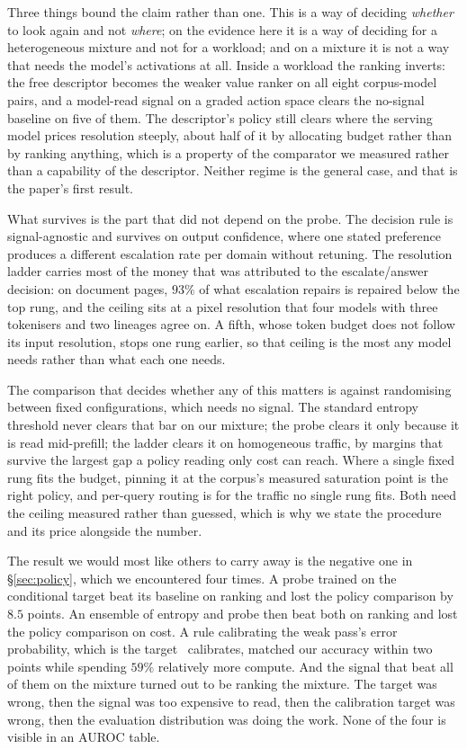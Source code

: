 \documentclass[10pt,twocolumn]{article}
\theoremstyle{plain}
\begin{document}
Three things bound the claim rather than one. This is a way of deciding
\emph{whether} to look again and not \emph{where}; on the evidence here it is a
way of deciding for a heterogeneous mixture and not for a workload; and on a
mixture it is not a way that needs the model's activations at all. Inside a
workload the ranking inverts: the free descriptor becomes the weaker value
ranker on all eight corpus-model pairs, and a model-read signal on a graded
action space clears the no-signal baseline on five of them. The descriptor's
policy still clears where the serving model prices resolution steeply, about
half of it by allocating budget rather than by ranking anything, which is a
property of the comparator we measured rather than a capability of the
descriptor. Neither regime is the general case, and that is the paper's first result.

What survives is the part that did not depend on the probe. The decision
rule is signal-agnostic and survives on output confidence, where one stated
preference produces a different escalation rate per domain without retuning. The
resolution ladder carries most of the money that was attributed to the
escalate/answer decision: on document pages, $93\%$ of what escalation repairs
is repaired below the top rung, and the ceiling sits at a pixel resolution that
four models with three tokenisers and two lineages agree on. A fifth, whose
token budget does not follow its input resolution, stops one rung earlier, so
that ceiling is the most any model needs rather than what each one needs.

The comparison that decides whether any of this matters is against randomising
between fixed configurations, which needs no signal. The standard entropy
threshold never clears that bar on our mixture; the probe clears it only because
it is read mid-prefill; the ladder clears it on homogeneous traffic, by margins
that survive the largest gap a policy reading only cost can reach. Where a
single fixed rung fits the budget, pinning it at the corpus's measured
saturation point is the right policy, and per-query routing is for the traffic
no single rung fits. Both need the ceiling measured rather than guessed, which
is why we state the procedure and its price alongside the number.

The result we would most like others to carry away is the negative one in
\S\ref{sec:policy}, which we encountered four times. A probe trained on the
conditional target beat its baseline on ranking and lost the policy comparison
by $8.5$ points. An ensemble of entropy and probe then beat both on ranking and
lost the policy comparison on cost. A rule calibrating the weak pass's error
probability, which is the target~\cite{ucci} calibrates, matched our accuracy
within two points while
spending $59\%$ relatively more compute. And the signal that beat all of them on
the mixture turned out to be ranking the mixture. The target was wrong, then the
signal was too expensive to read, then the calibration target was wrong, then
the evaluation distribution was doing the work. None of the four is visible in
an AUROC table.
\end{document}
